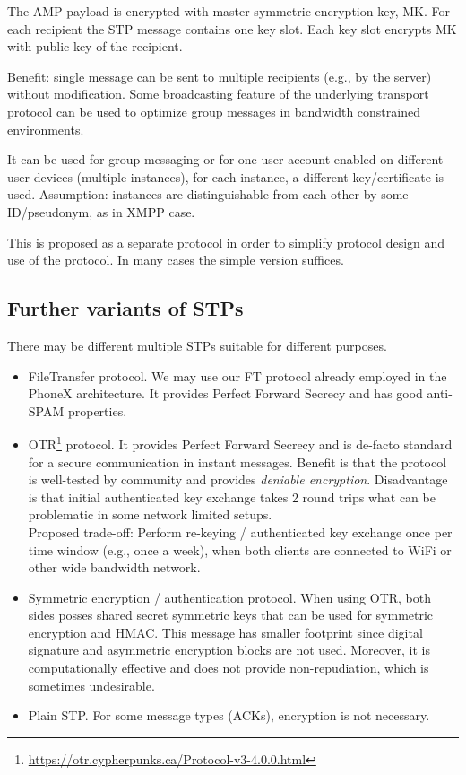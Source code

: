 \documentclass[a4paper,10pt]{article}
\begin{document}
The AMP payload is encrypted with master symmetric encryption key, MK.
For each recipient the STP message contains one key slot. Each key slot encrypts MK with 
public key of the recipient. 

Benefit: single message can be sent to multiple recipients (e.g., by the server) without modification. Some
broadcasting feature of the underlying transport protocol can be used to optimize group messages in bandwidth constrained environments.

It can be used for group messaging or for one user account enabled on different user devices (multiple instances),
for each instance, a different key/certificate is used. Assumption: instances are distinguishable from
each other by some ID/pseudonym, as in XMPP case.

This is proposed as a separate protocol in order to simplify protocol design and use of the protocol.
In many cases the simple version suffices.

\subsection{Further variants of STPs}
There may be different multiple STPs suitable for different purposes.
\begin{itemize}
 \item FileTransfer protocol. We may use our FT protocol already employed in the PhoneX architecture. It provides Perfect Forward Secrecy
 and has good anti-SPAM properties. 
 
 \item OTR\footnote{\url{https://otr.cypherpunks.ca/Protocol-v3-4.0.0.html}} protocol. It provides Perfect Forward Secrecy and is 
 de-facto standard for a secure communication in instant messages. Benefit is that the protocol is well-tested by community
 and provides \emph{deniable encryption}. Disadvantage is that initial authenticated key exchange takes 2 round trips what can be 
 problematic in some network limited setups. \\
 Proposed trade-off: Perform re-keying / authenticated key exchange once per time window (e.g., once a week), when both clients 
 are connected to WiFi or other wide bandwidth network. 
 
 \item Symmetric encryption / authentication protocol. When using OTR, both sides posses shared secret symmetric keys that can be used
 for symmetric encryption and HMAC. This message has smaller footprint since digital signature and asymmetric encryption blocks
 are not used. Moreover, it is computationally effective and does not provide non-repudiation, which is sometimes undesirable.
 
 \item Plain STP. For some message types (ACKs), encryption is not necessary.
\end{itemize}
\end{document}
